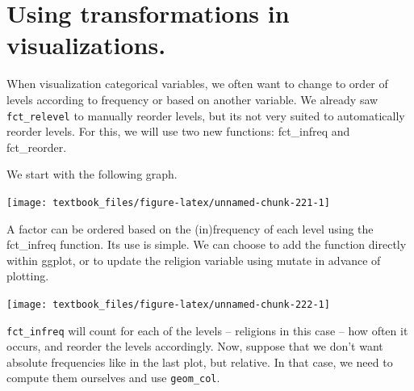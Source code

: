 \documentclass[]{tufte-book}
\newenvironment{Shaded}{}{}
\newcommand{\KeywordTok}[1]{\textcolor[rgb]{0.00,0.44,0.13}{\textbf{#1}}}
\newcommand{\NormalTok}[1]{#1}
\newcommand{\OperatorTok}[1]{\textcolor[rgb]{0.40,0.40,0.40}{#1}}
\newcommand{\StringTok}[1]{\textcolor[rgb]{0.25,0.44,0.63}{#1}}
\begin{document}
\hypertarget{using-transformations-in-visualizations.}{%
\section{Using transformations in visualizations.}\label{using-transformations-in-visualizations.}}

When visualization categorical variables, we often want to change to order of levels according to frequency or based on another variable. We already saw \texttt{fct\_relevel} to manually reorder levels, but its not very suited to automatically reorder levels. For this, we will use two new functions: fct\_infreq and fct\_reorder.

We start with the following graph.

\begin{Shaded}
\end{Shaded}

\texttt{[image: textbook\_files/figure-latex/unnamed-chunk-221-1]}

A factor can be ordered based on the (in)frequency of each level using the fct\_infreq function. Its use is simple. We can choose to add the function directly within ggplot, or to update the religion variable using mutate in advance of plotting.

\begin{Shaded}
\end{Shaded}

\texttt{[image: textbook\_files/figure-latex/unnamed-chunk-222-1]}

\texttt{fct\_infreq} will count for each of the levels -- religions in this case -- how often it occurs, and reorder the levels accordingly. Now, suppose that we don't want absolute frequencies like in the last plot, but relative. In that case, we need to compute them ourselves and use \texttt{geom\_col}.
\end{document}
